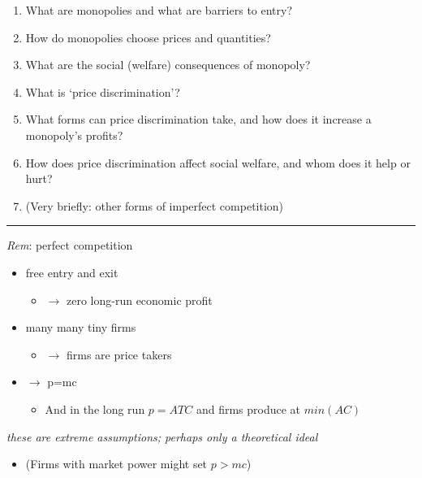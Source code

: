 \documentclass[]{article}
\providecommand{\tightlist}{%
  \setlength{\itemsep}{0pt}\setlength{\parskip}{0pt}}
\begin{document}
\begin{enumerate}
\def\labelenumi{\arabic{enumi}.}
\item
  What are monopolies and what are barriers to entry?
\item
  How do monopolies choose prices and quantities?
\item
  What are the social (welfare) consequences of monopoly?
\item
  What is `price discrimination'?
\item
  What forms can price discrimination take, and how does it increase a monopoly's profits?
\item
  How does price discrimination affect social welfare, and whom does it help or hurt?
\item
  (Very briefly: other forms of imperfect competition)
\end{enumerate}

\begin{center}\rule{0.5\linewidth}{\linethickness}\end{center}

\emph{Rem}: perfect competition

\begin{itemize}
\tightlist
\item
  free entry and exit

  \begin{itemize}
  \tightlist
  \item
    \(\rightarrow\) zero long-run economic profit
  \end{itemize}
\item
  many many tiny firms

  \begin{itemize}
  \tightlist
  \item
    \(\rightarrow\) firms are price takers
  \end{itemize}
\item
  \(\rightarrow\) p=mc

  \begin{itemize}
  \tightlist
  \item
    And in the long run \(p=ATC\) and firms produce at \(min(AC)\)
  \end{itemize}
\end{itemize}

\bigskip

\emph{these are extreme assumptions; perhaps only a theoretical ideal}

\bigskip

\begin{itemize}
\tightlist
\item
  (Firms with market power might set \(p>mc\))
\end{itemize}
\end{document}
